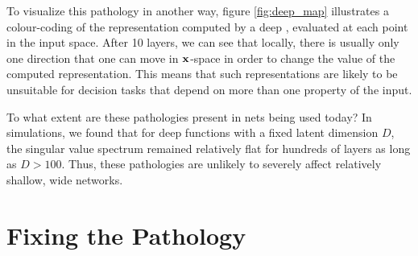 %
To visualize this pathology in another way, figure \ref{fig:deep_map} illustrates a colour-coding of the representation computed by a deep \gp{}, evaluated at each point in the input space.  After 10 layers, we can see that locally, there is usually only one direction that one can move in ${\bf{x}}$-space in order to change the value of the computed representation.  This means that such representations are likely to be unsuitable for decision tasks that depend on more than one property of the input.

To what extent are these pathologies present in nets being used today?  In simulations, we found that for deep functions with a fixed latent dimension $D$, the singular value spectrum remained relatively flat for hundreds of layers as long as $D > 100$.  Thus, these pathologies are unlikely to severely affect relatively shallow, wide networks.






\section{Fixing the Pathology}
\label{sec:fix}

